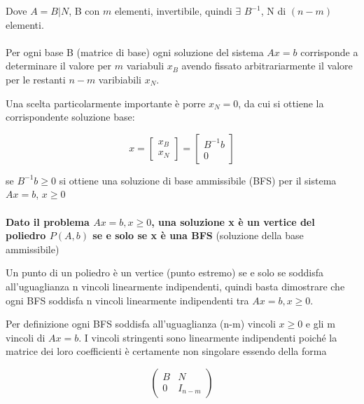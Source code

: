 \documentclass[a4paper, 11pt]{article}
\begin{document}
        Dove $A = B|N$, B con $m$ elementi, invertibile, quindi $\exists$ $B^{-1}$, N di $(n-m)$ elementi.
        

        \paragraph{}
        Per ogni base B (matrice di base) ogni soluzione del sistema $Ax = b$ corrisponde a determinare il valore per $m$ variabuli $x_B$ avendo fissato arbitrariarmente il valore per le restanti $n-m$ varibiabili $x_N$.

        Una scelta particolarmente importante è porre $x_N = 0$, da cui si ottiene la corrispondente soluzione base: 
        
        \[ 
            x = 
            \begin{bmatrix}
                x_B \\
                x_N
            \end{bmatrix}
            = 
            \begin{bmatrix}
                B^{-1}b \\
                0
            \end{bmatrix}
        \]

        se $B^{-1} b \geq 0$ si ottiene una soluzione di base ammissibile (BFS) per il sistema $Ax = b$, $x \geq 0$


        \paragraph{}
        \textbf{Dato il problema $Ax = b,x \geq 0$, una soluzione x è un vertice del
        poliedro $P(A, b)$ se e solo se x è una BFS} (soluzione della base ammissibile)

        Un punto di un poliedro è un vertice (punto estremo) se e solo se soddisfa all’uguaglianza n vincoli linearmente indipendenti, quindi basta dimostrare che ogni BFS soddisfa n vincoli linearmente indipendenti tra $Ax = b,x \geq 0$.

        Per definizione ogni BFS soddisfa all’uguaglianza (n-m) vincoli $x \geq 0$ e gli m
        vincoli di $Ax = b$. I vincoli stringenti sono linearmente indipendenti poiché la matrice dei loro coefficienti è certamente non singolare essendo della forma
        

        \[
            \begin{pmatrix}
                B & N \\
                0 & I_{n-m}
            \end{pmatrix}
        \]
\end{document}
